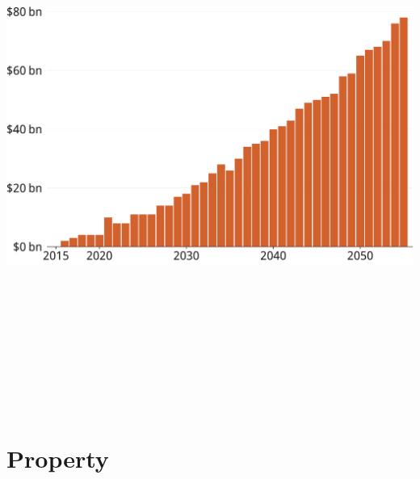 \documentclass[tikz]{standalone}\usepackage[]{graphicx}\usepackage[]{color}
\newenvironment{knitrout}{}{} %
\begin{document}
\begin{knitrout}
\color{fgcolor}
\includegraphics[width=11.000in,height=7.00in]{./b5-figure/FISCAL-Figure15-1} 

\end{knitrout}

\section{Property}
\end{document}
